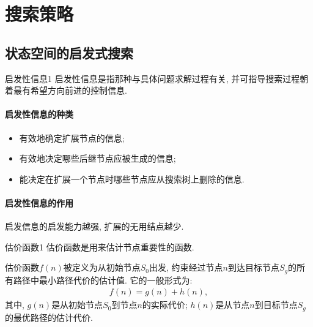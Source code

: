 \section{搜索策略}
\subsection{状态空间的启发式搜索}
\begin{mydef}{启发性信息}{1}
    启发性信息是指那种与具体问题求解过程有关, 并可指导搜索过程朝着最有希望方向前进的控制信息.
\end{mydef}

\paragraph{启发性信息的种类}
\begin{itemize}
\item 有效地确定扩展节点的信息;
\item 有效地决定哪些后继节点应被生成的信息;
\item 能决定在扩展一个节点时哪些节点应从搜索树上删除的信息.
\end{itemize}
\paragraph{启发性信息的作用} 启发信息的启发能力越强, 扩展的无用结点越少.

\begin{mydef}{估价函数}{1}
    估价函数是用来估计节点重要性的函数.
\end{mydef}
估价函数$f(n)$被定义为从初始节点$S_0$出发, 约束经过节点$n$到达目标节点$S_g$的所有路径中最小路径代价的估计值. 它的一般形式为:
\begin{align}
    f(n)=g(n)+h(n),
\end{align}
其中, $g(n)$是从初始节点$S_0$到节点$n$的实际代价; $h(n)$是从节点$n$到目标节点$S_g$的最优路径的估计代价.
